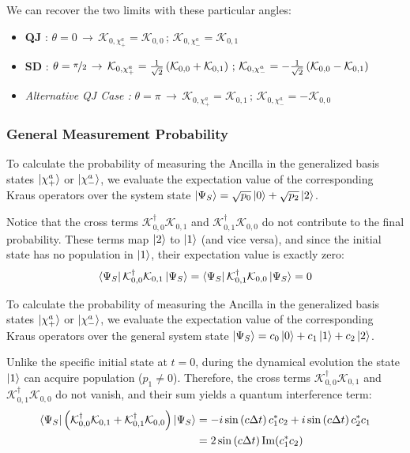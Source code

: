 \documentclass[a4paper,12pt]{article}
\begin{document}
We can recover the two limits with these particular angles: 
\begin{itemize}
	\item \textbf{QJ} : $ \theta = 0 \, \rightarrow \,  \mathcal{K}_{0, \chi_{+}^{a}} = \mathcal{K}_{0,0} \, ; \, \mathcal{K}_{0, \chi_{-}^{a}} = \mathcal{K}_{0,1} $
	\item \textbf{SD} : $ \theta = \nicefrac{\pi}{2} \, \rightarrow \,  \mathcal{K}_{0, \chi_{+}^{a}} = \frac{1}{\sqrt{2}} \left( \mathcal{K}_{0,0} + \mathcal{K}_{0,1} \right) \, ; \, \mathcal{K}_{0, \chi_{-}^{a}} = -\frac{1}{\sqrt{2}} \left( \mathcal{K}_{0,0} - \mathcal{K}_{0,1} \right) $
	\item \textit{Alternative QJ Case :} $ \theta = \pi \, \rightarrow \,  \mathcal{K}_{0, \chi_{+}^{a}} = \mathcal{K}_{0,1} \, ; \, \mathcal{K}_{0, \chi_{-}^{a}} = -\mathcal{K}_{0,0} $
\end{itemize}
\subsubsection{General Measurement Probability}
\label{subsub:General_Probability}

To calculate the probability of measuring the Ancilla in the generalized basis states $ \ket{\chi_{+}^{a}} $ or $ \ket{\chi_{-}^{a}} $, we evaluate the expectation value of the corresponding Kraus operators over the system state $ \ket{\Psi_{S}} = \sqrt{p_{0}} \ket{0} + \sqrt{p_{2}} \ket{2} $.

Notice that the cross terms $ \mathcal{K}_{0,0}^\dagger \mathcal{K}_{0,1} $ and $ \mathcal{K}_{0,1}^\dagger \mathcal{K}_{0,0} $ do not contribute to the final probability. These terms map $ \ket{2} $ to $ \ket{1} $ (and vice versa), and since the initial state has no population in $ \ket{1} $, their expectation value is exactly zero:
\begin{equation}
	\bra{\Psi_{S}} \mathcal{K}_{0,0}^\dagger \mathcal{K}_{0,1} \ket{\Psi_{S}} = \bra{\Psi_{S}} \mathcal{K}_{0,1}^\dagger \mathcal{K}_{0,0} \ket{\Psi_{S}} = 0
\end{equation}

To calculate the probability of measuring the Ancilla in the generalized basis states $ \ket{\chi_{+}^{a}} $ or $ \ket{\chi_{-}^{a}} $, we evaluate the expectation value of the corresponding Kraus operators over the general system state $ \ket{\Psi_{S}} = c_{0} \ket{0} + c_{1} \ket{1} + c_{2} \ket{2} $.

Unlike the specific initial state at $ t=0 $, during the dynamical evolution the state $ \ket{1} $ can acquire population ($ p_1 \neq 0 $). Therefore, the cross terms $ \mathcal{K}_{0,0}^\dagger \mathcal{K}_{0,1} $ and $ \mathcal{K}_{0,1}^\dagger \mathcal{K}_{0,0} $ do not vanish, and their sum yields a quantum interference term:
\begin{align}
	\bra{\Psi_{S}} \left( \mathcal{K}_{0,0}^\dagger \mathcal{K}_{0,1} + \mathcal{K}_{0,1}^\dagger \mathcal{K}_{0,0} \right) \ket{\Psi_{S}} &= -i \sin \left( c \Delta t \right) c_{1}^* c_{2} + i \sin \left( c \Delta t \right) c_{2}^* c_{1} \notag \\
	&= 2 \sin \left( c \Delta t \right) \text{Im}(c_1^* c_2)
\end{align}
\end{document}
